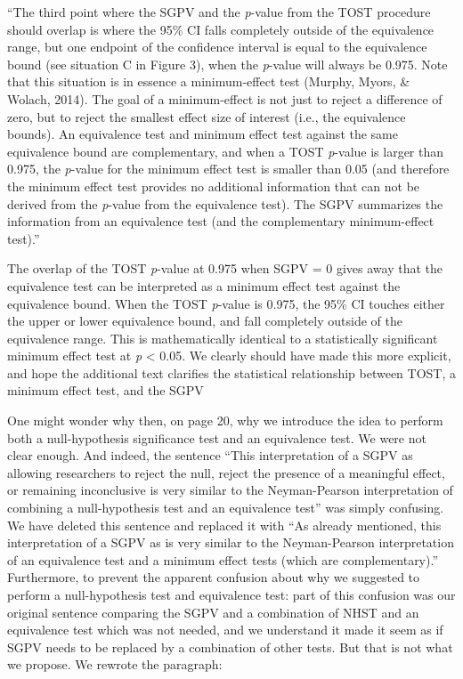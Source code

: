 \documentclass[man]{apa6}
\begin{document}
\enquote{The third point where the SGPV and the \emph{p}-value from the TOST procedure should overlap is where the 95\% CI falls completely outside of the equivalence range, but one endpoint of the confidence interval is equal to the equivalence bound (see situation C in Figure 3), when the \emph{p}-value will always be 0.975. Note that this situation is in essence a minimum-effect test (Murphy, Myors, \& Wolach, 2014). The goal of a minimum-effect is not just to reject a difference of zero, but to reject the smallest effect size of interest (i.e., the equivalence bounds). An equivalence test and minimum effect test against the same equivalence bound are complementary, and when a TOST \emph{p}-value is larger than 0.975, the \emph{p}-value for the minimum effect test is smaller than 0.05 (and therefore the minimum effect test provides no additional information that can not be derived from the \emph{p}-value from the equivalence test). The SGPV summarizes the information from an equivalence test (and the complementary minimum-effect test).}

The overlap of the TOST \emph{p}-value at 0.975 when SGPV = 0 gives away that the equivalence test can be interpreted as a minimum effect test against the equivalence bound. When the TOST \emph{p}-value is 0.975, the 95\% CI touches either the upper or lower equivalence bound, and fall completely outside of the equivalence range. This is mathematically identical to a statistically significant minimum effect test at \emph{p} \textless{} 0.05. We clearly should have made this more explicit, and hope the additional text clarifies the statistical relationship between TOST, a minimum effect test, and the SGPV

One might wonder why then, on page 20, why we introduce the idea to perform both a null-hypothesis significance test and an equivalence test. We were not clear enough. And indeed, the sentence \enquote{This interpretation of a SGPV as allowing researchers to reject the null, reject the presence of a meaningful effect, or remaining inconclusive is very similar to the Neyman-Pearson interpretation of combining a null-hypothesis test and an equivalence test} was simply confusing. We have deleted this sentence and replaced it with \enquote{As already mentioned, this interpretation of a SGPV as is very similar to the Neyman-Pearson interpretation of an equivalence test and a minimum effect tests (which are complementary).} Furthermore, to prevent the apparent confusion about why we suggested to perform a null-hypothesis test and equivalence test: part of this confusion was our original sentence comparing the SGPV and a combination of NHST and an equivalence test which was not needed, and we understand it made it seem as if SGPV needs to be replaced by a combination of other tests. But that is not what we propose. We rewrote the paragraph:
\end{document}
